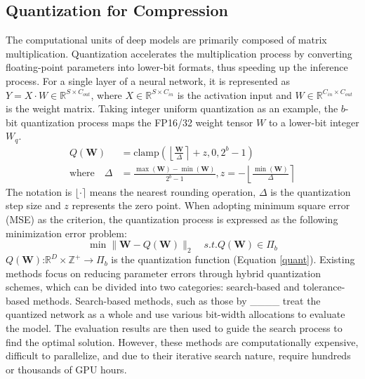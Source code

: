 \subsection{Quantization for Compression}
The computational units of deep models are primarily composed of matrix multiplication. Quantization accelerates the multiplication process by converting floating-point parameters into lower-bit formats, thus speeding up the inference process. For a single layer of a neural network, it is represented as $Y=X\cdot W \in \mathbb{R}^{S\times C_{out}}$, where $X\in \mathbb{R}^{S\times C_{in}}$ is the activation input and $W \in \mathbb{R}^{C_{in}\times C_{out}}$ is the weight matrix. Taking integer uniform quantization as an example, the $b$-bit quantization process maps the FP16/32 weight tensor $W$ to a lower-bit integer $W_q$.
\begin{equation}
\begin{aligned}
Q(\textbf{W})&=\mathrm{clamp}\left(\left\lfloor\frac{\mathbf{W}}{\Delta}\right\rceil+z,0,2^b-1\right) \\
\mathrm{where}\quad\Delta&=\frac{\max(\mathbf{W})-\min(\mathbf{W})}{2^b-1},z=-\left\lfloor\frac{\min(\mathbf{W})}{\Delta}\right\rceil
\end{aligned}
\label{quant}
\end{equation}
The notation is $\lfloor\cdot\rceil$ means the nearest rounding operation, $\Delta$ is the quantization step size and $z$ represents the zero point.
When adopting minimum square error (MSE) as the criterion, the quantization process is expressed as the following minimization error problem:
\begin{equation}
\operatorname*{min}\|\textbf{W}-Q(\textbf{W})\|_{2}\quad s.t.Q(\textbf{W})\in\Pi_{b}
\end{equation}
$Q(\textbf{W})$:$\mathbb{R}^D\times\mathbb{Z}^+\to\Pi_b$ is the quantization function (Equation \ref{quant}).
Existing methods focus on reducing parameter errors through hybrid quantization schemes, which can be divided into two categories: search-based and tolerance-based methods.
Search-based methods, such as those by ____ treat the quantized network as a whole and use various bit-width allocations to evaluate the model. The evaluation results are then used to guide the search process to find the optimal solution. However, these methods are computationally expensive, difficult to parallelize, and due to their iterative search nature, require hundreds or thousands of GPU hours.


